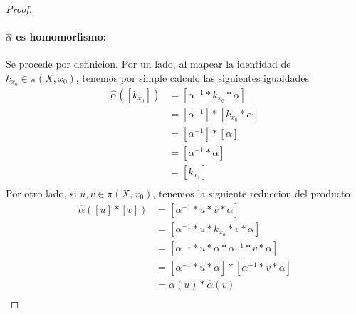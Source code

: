 {\begin{proof}
  \paragraph{\(\hat \alpha\) es homomorfismo:} Se procede por
  definicion. Por un lado, al mapear la identidad de \(k_{x_0} \in \pi
  (X, x_0) \), tenemos por simple calculo las siguientes igualdades
  \begin{align*}
    \hat \alpha ([k_{x_0}])
                 &= [\alpha^{-1} * k_{x_0} * \alpha] \\
                 &= [\alpha^{-1}] * [k_{x_0} * \alpha] \\
                 &= [\alpha^{-1}] * [\alpha] \\
                 &= [\alpha^{-1} * \alpha] \\
                 &= [k_{x_1}] \\
  \end{align*}
  Por otro lado, si \(u,v \in \pi (X, x_0) \), tenemos la siguiente
  reduccion del producto
  \begin{align*}
    \hat \alpha ([u] * [v]) &= [\alpha^{-1} * u * v * \alpha] \\
    &= [\alpha^{-1} * u * k_{x_0} * v * \alpha] \\
    &= [\alpha^{-1} * u * \alpha * \alpha^{-1} * v * \alpha] \\
    &= [\alpha^{-1} * u * \alpha ] * [ \alpha^{-1} * v * \alpha] \\
    &= \hat \alpha (u) * \hat \alpha (v) \\
  \end{align*}


\end{proof}}
